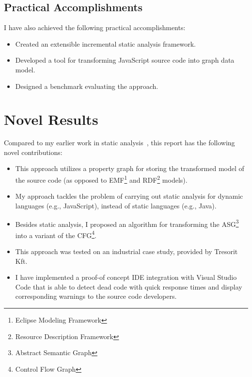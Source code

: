 \subsection{Practical Accomplishments}
I have also achieved the following practical accomplishments:

\begin{itemize}[topsep=0pt]
	\item Created an extensible incremental static analysis framework.
	\item Developed a tool for transforming JavaScript source code into graph data model.
	\item Designed a benchmark evaluating the approach.
\end{itemize}

\section{Novel Results}
Compared to my earlier work in static analysis~\cite{stein-daniel-tdk,stein-daniel-bsc,stein-daniel-ttc}, this report has the following novel contributions:

\begin{itemize}[topsep=0pt]
	\item This approach utilizes a property graph for storing the transformed model of the source code (as opposed to EMF\footnote{Eclipse Modeling Framework} and RDF\footnote{Resource Description Framework} models).

	\item My approach tackles the problem of carrying out static analysis for dynamic languages (e.g., JavaScript), instead of static languages (e.g., Java).

	\item Besides static analysis, I proposed an algorithm for transforming the ASG\footnote{Abstract Semantic Graph} into a variant of the CFG\footnote{Control Flow Graph}.

	\item This approach was tested on an industrial case study, provided by Tresorit Kft.

	\item I have implemented a proof-of concept IDE integration with Visual Studio Code that is able to detect dead code with quick response times and display corresponding warnings to the source code developers.
\end{itemize}
